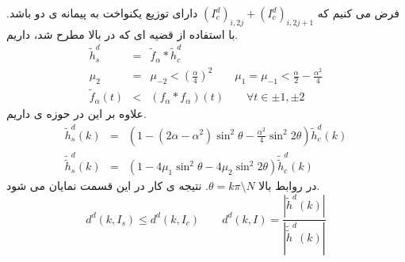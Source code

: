 فرض می کنیم که $ (I^{d}_{c})_{i,2j}+(I^{d}_{c})_{i,2j+1} $ دارای توزیع یکنواخت به پیمانه ی دو باشد. با استفاده از قضیه ای که در بالا مطرح شد، داریم.
\begin{eqnarray}
\tilde{h}^{d}_{s}&=&\tilde{f}_{\alpha }*\tilde{h}_{c}^{d}\nonumber \\
\mu _{2}&=&\mu _{-2}<(\frac{\alpha }{4})^{2}\qquad \mu _{1}=\mu _{-1}<\frac{\alpha }{2}-\frac{\alpha ^2}{4} \nonumber \\
\tilde{f}_{\alpha }(t)&<& (f_{\alpha }*f_{\alpha })(t)\qquad \forall t\in {\pm 1,\pm 2 } 
\end{eqnarray}
علاوه بر این در حوزه ی {} داریم.
\begin{eqnarray}
\tilde{h}^{d}_{s}(k)&=&(1-(2\alpha - \alpha ^{2})\sin ^{2}\theta -\frac{\alpha ^{2} }{4}\sin ^{2}2\theta )\tilde{h}^{d}_{c}(k)\\
\tilde{\tilde{h}}^{d}_{s}(k)&=&(1-4\mu _{1}\sin ^{2}\theta -4\mu _{2}\sin ^{2}2\theta )\tilde{\tilde{h}}^{d}_{c}(k)
\end{eqnarray}
در روابط بالا $ \theta = k\pi\setminus N $. نتیجه ی کار در این قسمت نمایان می شود. 
\begin{equation}
d^{d}(k,I_{s})\leq d^{d}(k,I_{c})\qquad d^{d}(k,I)=\frac{|\tilde{h}^{d}(k) |}{|\tilde{\tilde{h}}^{d}(k) |}
\end{equation}


